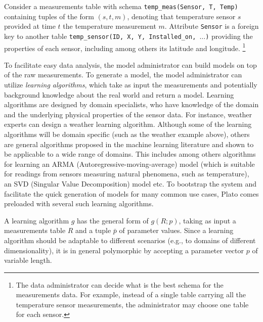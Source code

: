 \vspace*{0.5cm}
\begin{example}
Consider a measurements table with schema \texttt{temp\_meas(Sensor, T, Temp)} containing tuples of the form $(s, t, m)$, denoting that temperature sensor $s$ provided at time $t$ the temperature measurement $m$.
Attribute \texttt{Sensor} is a foreign key to another table \texttt{temp\_sensor(ID, X, Y, Installed\_on, $\ldots$)} providing the properties of each sensor, including among others its latitude and longitude.
\footnote{The data administrator can decide what is the best schema for the measurements data. For example, instead of a single table carrying all the temperature sensor measurements, the administrator may choose one table for each sensor.
}
\end{example}
\vspace*{0.5cm}

To facilitate easy data analysis, the model administrator can build models on top of the raw measurements. To generate a model, the model administrator can utilize {\em learning algorithms}, which take as input the measurements and potentially background knowledge about the real world and return a model. Learning algorithms are designed by domain specialists, who have knowledge of the domain and the underlying physical properties of the sensor data. For instance, weather experts can design a weather learning algorithm. Although some of the learning algorithms will be domain specific (such as the weather example above), others are general algorithms proposed in the machine learning literature  and shown to be applicable to a wide range of domains. This includes among others algorithms for learning an ARMA (Autoregressive-moving-average) model (which is suitable for readings from sensors measuring natural phenomena, such as temperature), an SVD (Singular Value Decomposition) model etc. To bootstrap the system and facilitate the quick generation of models for many common use cases, Plato comes preloaded with several such learning algorithms.

A learning algorithm $g$ has the general form of $g(R;p)$, taking as input a measurements table $R$ and a tuple $\bar{p}$ of parameter values. Since a learning algorithm should be adaptable to different scenarios (e.g., to domains of different dimensionality), it is in general polymorphic by accepting a parameter vector $p$ of variable length.

